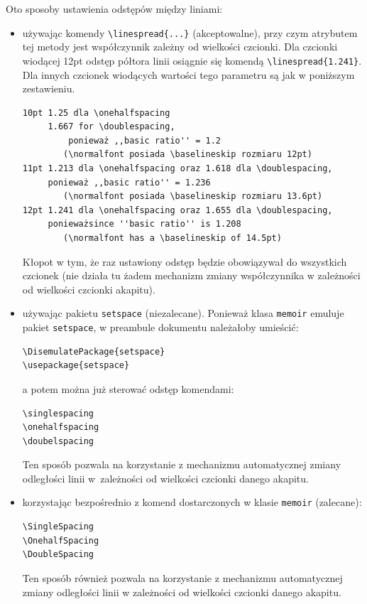Oto sposoby ustawienia odstępów między liniami:
\begin{itemize}
\item używając komendy \verb+\linespread{...}+ (akceptowalne), przy czym atrybutem tej metody jest współczynnik zależny od wielkości
czcionki.  Dla czcionki wiodącej 12pt odstęp półtora linii osiągnie się komendą \verb+\linespread{1.241}+. Dla innych czcionek wiodących wartości tego parametru są jak w poniższym zestawieniu.
\begin{lstlisting}[basicstyle=\footnotesize\ttfamily]
10pt 1.25 dla \onehalfspacing 
     1.667 for \doublespacing, 
		 ponieważ ,,basic ratio'' = 1.2 
		(\normalfont posiada \baselineskip rozmiaru 12pt)
11pt 1.213 dla \onehalfspacing oraz 1.618 dla \doublespacing, 
     ponieważ ,,basic ratio'' = 1.236 
		(\normalfont posiada \baselineskip rozmiaru 13.6pt)
12pt 1.241 dla \onehalfspacing oraz 1.655 dla \doublespacing, 
     ponieważsince ''basic ratio'' is 1.208 
		(\normalfont has a \baselineskip of 14.5pt)
\end{lstlisting}
Kłopot w tym, że raz ustawiony odstęp będzie obowiązywał do wszystkich czcionek (nie działa tu żadem mechanizm zmiany współczynnika w zależności od wielkości czcionki akapitu).

\item używając pakietu \texttt{setspace} (niezalecane). Ponieważ klasa \texttt{memoir} emuluje pakiet \texttt{setspace}, w preambule dokumentu należałoby umieścić:
\begin{lstlisting}[basicstyle=\footnotesize\ttfamily]
\DisemulatePackage{setspace}
\usepackage{setspace}
\end{lstlisting}
a potem można już sterować odstęp komendami:
\begin{lstlisting}[basicstyle=\footnotesize\ttfamily]
\singlespacing
\onehalfspacing
\doubelspacing
\end{lstlisting}
Ten sposób pozwala na korzystanie z mechanizmu automatycznej zmiany odległości linii w~zależności od wielkości czcionki danego akapitu.
\item korzystając bezpośrednio z komend dostarczonych w klasie \texttt{memoir} (zalecane):
\begin{lstlisting}[basicstyle=\footnotesize\ttfamily]
\SingleSpacing
\OnehalfSpacing
\DoubleSpacing
\end{lstlisting}
Ten sposób również pozwala na korzystanie z mechanizmu automatycznej zmiany odległości linii w zależności od wielkości czcionki danego akapitu.
\end{itemize}

